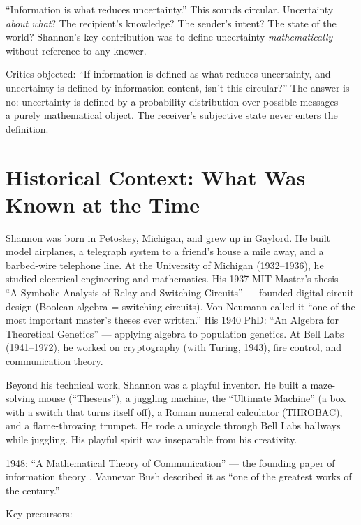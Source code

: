 ``Information is what reduces uncertainty.'' This sounds circular. Uncertainty \emph{about what}? The recipient's knowledge? The sender's intent? The state of the world? Shannon's key contribution was to define uncertainty \emph{mathematically} — without reference to any knower.

Critics objected: ``If information is defined as what reduces uncertainty, and uncertainty is defined by information content, isn't this circular?'' The answer is no: uncertainty is defined by a probability distribution over possible messages — a purely mathematical object. The receiver's subjective state never enters the definition.

\section{Historical Context: What Was Known at the Time}
\label{sec:information:context}

Shannon was born in Petoskey, Michigan, and grew up in Gaylord. He built model airplanes, a telegraph system to a friend's house a mile away, and a barbed-wire telephone line. At the University of Michigan (1932--1936), he studied electrical engineering and mathematics. His 1937 MIT Master's thesis — ``A Symbolic Analysis of Relay and Switching Circuits'' — founded digital circuit design (Boolean algebra = switching circuits). Von Neumann called it ``one of the most important master's theses ever written.'' His 1940 PhD: ``An Algebra for Theoretical Genetics'' — applying algebra to population genetics. At Bell Labs (1941--1972), he worked on cryptography (with Turing, 1943), fire control, and communication theory.

Beyond his technical work, Shannon was a playful inventor. He built a maze-solving mouse (``Theseus''), a juggling machine, the ``Ultimate Machine'' (a box with a switch that turns itself off), a Roman numeral calculator (THROBAC), and a flame-throwing trumpet. He rode a unicycle through Bell Labs hallways while juggling. His playful spirit was inseparable from his creativity.

1948: ``A Mathematical Theory of Communication'' --- the founding paper of information theory \cite{Shannon1948}. Vannevar Bush described it as ``one of the greatest works of the century.''

Key precursors:

